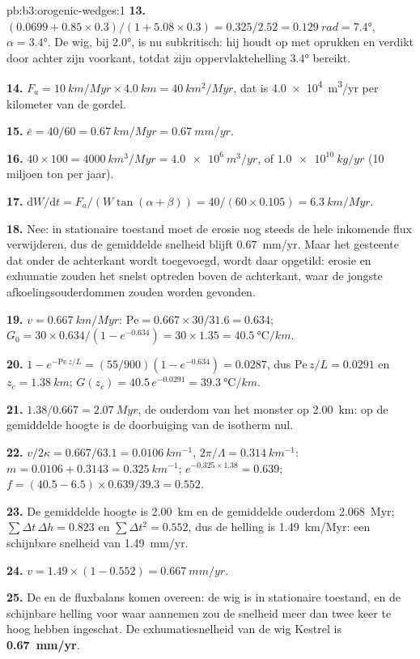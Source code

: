 \begin{solution}{pb:b3:orogenic-wedges:1}
\textbf{13.} $(0.0699 + 0.85\times0.3)/(1 + 5.08\times0.3) = 0.325/2.52 =
\qty{0.129}{rad} = \ang{7.4}$, $\alpha = \ang{3.4}$. De wig, bij \ang{2.0},
is nu subkritisch: hij houdt op met oprukken en verdikt door
 achter zijn voorkant, totdat zijn oppervlaktehelling \ang{3.4} bereikt.

\textbf{14.} $F_a = \qty{10}{km/Myr}\times\qty{4.0}{km} = \qty{40}{km^2/Myr}$,
dat is \qty{4.0e4}{m^3/yr} per kilometer van de gordel.

\textbf{15.} $\bar e = 40/60 = \qty{0.67}{km/Myr} = \qty{0.67}{mm/yr}$.

\textbf{16.} $40\times100 = \qty{4000}{km^3/Myr} = \qty{4.0e6}{m^3/yr}$, of
$\qty{1.0e10}{kg/yr}$ (10 miljoen ton per jaar).

\textbf{17.} $\mathrm dW/\mathrm dt = F_a/(W\tan(\alpha + \beta)) =
40/(60\times0.105) = \qty{6.3}{km/Myr}$.

\textbf{18.} Nee: in stationaire toestand moet de erosie nog steeds de hele
inkomende flux verwijderen, dus de gemiddelde snelheid blijft \qty{0.67}{mm/yr}. Maar het gesteente dat
onder de achterkant wordt toegevoegd, wordt daar opgetild: erosie en exhumatie zouden het snelst
optreden boven de achterkant, waar de jongste afkoelingsouderdommen zouden worden gevonden.

\textbf{19.} $v = \qty{0.667}{km/Myr}$: $\mathrm{Pe} = 0.667\times30/31.6 =
0.634$; $G_0 = 30\times0.634/(1 - e^{-0.634}) = 30\times1.35 =
\qty{40.5}{\celsius/km}$.

\textbf{20.} $1 - e^{-\mathrm{Pe}\,z/L} = (55/900)(1 - e^{-0.634}) = 0.0287$,
dus $\mathrm{Pe}\,z/L = 0.0291$ en $z_c = \qty{1.38}{km}$; $G(z_c) =
40.5\,e^{-0.0291} = \qty{39.3}{\celsius/km}$.

\textbf{21.} $1.38/0.667 = \qty{2.07}{Myr}$, de ouderdom van het monster op
\qty{2.00}{km}: op de gemiddelde hoogte is de doorbuiging van de isotherm nul.

\textbf{22.} $v/2\kappa = 0.667/63.1 = \qty{0.0106}{km^{-1}}$, $2\pi/\Lambda =
\qty{0.314}{km^{-1}}$: $m = 0.0106 + 0.3143 = \qty{0.325}{km^{-1}}$;
$e^{-0.325\times1.38} = 0.639$; $f = (40.5 - 6.5)\times0.639/39.3 = 0.552$.

\textbf{23.} De gemiddelde hoogte is \qty{2.00}{km} en de gemiddelde ouderdom
\qty{2.068}{Myr}; $\sum\Delta t\,\Delta h = 0.823$ en $\sum\Delta t^2 =
0.552$, dus de helling is \qty{1.49}{km/Myr}: een schijnbare snelheid van
\qty{1.49}{mm/yr}.

\textbf{24.} $v = 1.49\times(1 - 0.552) = \qty{0.667}{mm/yr}$.

\textbf{25.} De  en de fluxbalans komen overeen: de wig is
in stationaire toestand, en de schijnbare helling voor waar aannemen zou
de snelheid meer dan twee keer te hoog hebben ingeschat. De exhumatiesnelheid van de wig Kestrel
is \textbf{\qty[text-series-to-math=true]{0.67}{mm/yr}}.
\end{solution}
